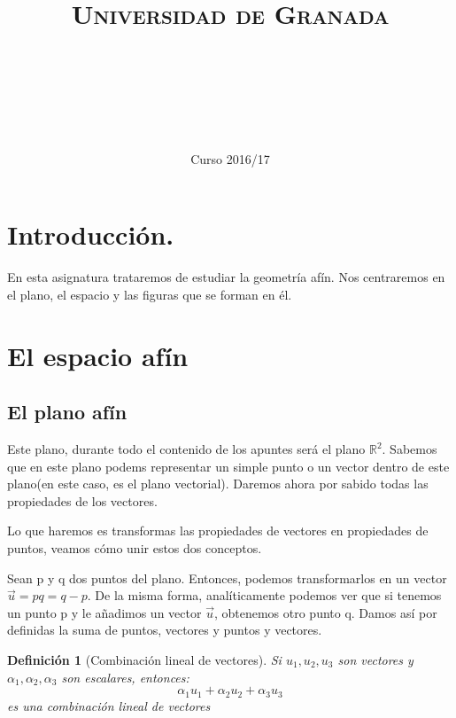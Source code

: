 \documentclass[11pt, a4paper, titlepage]{article}
\title{
  \normalfont \normalsize 
  \textsc{Universidad de Granada} \\ [25pt]    %
  \horrule{0.5pt} \\[0.4cm] %
  \huge \subject\\ %
  \horrule{2pt} \\[0.5cm] %
}
\author{\Large{\docauthor}}
\date{\vspace{-1.5em} \normalsize Curso 2016/17}
\newcommand{\R}{\mathbb{R}}
\theoremstyle{theorem-style}
\theoremstyle{definition-style}
\newtheorem*{ndef}{Definición}
\theoremstyle{remark-style}
\theoremstyle{example-style}
\begin{document}
\maketitle  %
\tableofcontents    %
\newpage



\section*{Introducción.}
En esta asignatura trataremos de estudiar la geometría afín. Nos centraremos en el plano, el espacio y las figuras que se forman en él.
\newpage

\section{El espacio afín}

\subsection{El plano afín}
Este plano, durante todo el contenido de los apuntes será el plano $\R^2$. Sabemos que en este plano podems representar un simple punto o un vector dentro de este plano(en este caso, es el plano vectorial). Daremos ahora por sabido todas las propiedades de los vectores.


Lo que haremos es transformas las propiedades de vectores en propiedades de puntos, veamos cómo unir estos dos conceptos.

Sean p y q dos puntos del plano. Entonces, podemos transformarlos en un vector $\vec{u} = pq = q-p$. De la misma forma, analíticamente podemos ver que si tenemos un punto p y le añadimos un vector $\vec{u}$, obtenemos otro punto q. Damos así por definidas la suma de puntos, vectores y puntos y vectores.



\begin{ndef}[Combinación lineal de vectores]
	Si $u_1,u_2,u_3$ son vectores y $\alpha_1,\alpha_2,\alpha_3$ son escalares, entonces:
	\[
	\alpha_1 u_1+ \alpha_2 u_2 + \alpha_3 u_3
	\]
	es una combinación lineal de vectores
\end{ndef}
\end{document}
